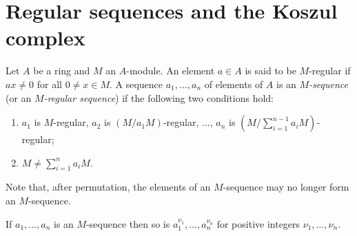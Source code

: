 \section{Regular sequences and the Koszul complex}\label{sec:16}

Let $A$ be a ring and $M$ an $A$-module. An element $a \in A$ is said
to be $M$-regular if $ax \neq 0$ for all $0 \neq x \in M$. A sequence $a_1, \ldots, a_n$ of elements
of $A$ is an \emph{$M$-sequence} (or an \emph{$M$-regular sequence}) if the following two
conditions hold:
\begin{enumerate}[(1)]
  \item $a_1$ is $M$-regular, $a_2$ is $(M/a_1M)$-regular, $\ldots$, $a_n$ is $(M/\sum_{i=1}^{n-1} a_iM)$-
        regular;
  \item $M \neq \sum_{i=1}^{n} a_iM$.
\end{enumerate}
Note that, after permutation, the elements of an $M$-sequence may no longer
form an $M$-sequence.

\begin{theorem}\label{thm:16.1}
If $a_1, \ldots, a_n$ is an $M$-sequence then so is $a_1^{\nu_1}, \ldots, a_n^{\nu_n}$ for
positive integers $\nu_1, \ldots, \nu_n$.
\end{theorem}

